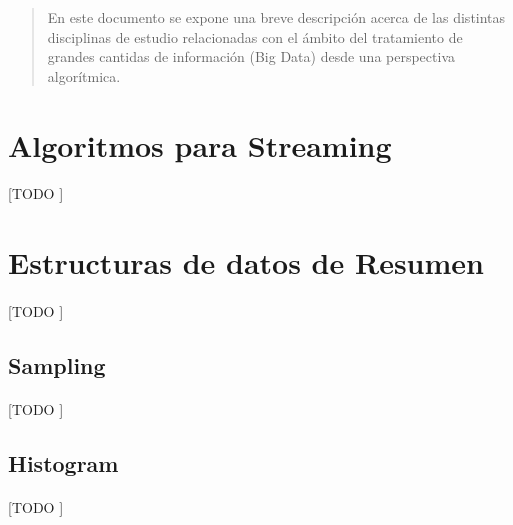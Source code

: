 \documentclass{article}
\begin{document}
  \maketitle %



  	\begin{abstract}
  		\noindent En este documento se expone una breve descripción acerca de las distintas disciplinas de estudio relacionadas con el ámbito del tratamiento de grandes cantidas de información (Big Data) desde una perspectiva algorítmica.
  	\end{abstract}


  \section{Algoritmos para Streaming}

    \paragraph{}
    [TODO ]

  \section{Estructuras de datos de Resumen}

    \paragraph{}
    [TODO ]

    \subsection{Sampling}

      \paragraph{}
      [TODO ]

    \subsection{Histogram}

      \paragraph{}
      [TODO ]
\end{document}
